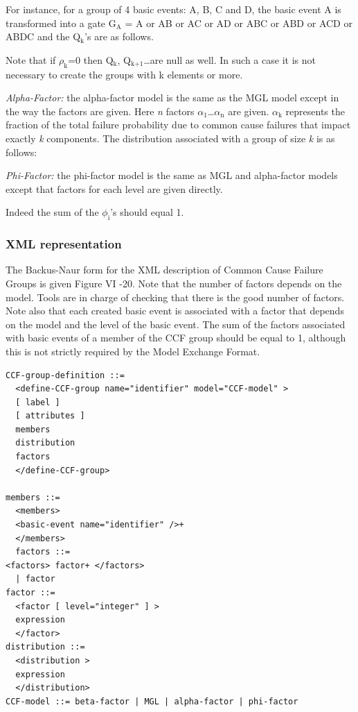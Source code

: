 \documentclass[11pt]{article}
\begin{document}
For instance, for a group of 4 basic events: A, B, C and D, the basic
event A is transformed into a gate G\(_{\text{A}}\) = A or AB or AC or AD or ABC or
ABD or ACD or ABDC and the Q\(_{\text{k}}\)'s are as follows.

Note that if \(\rho_{\text{k}}\)=0 then Q\(_{\text{k}}\), Q\(_{\text{k+1}}\)\ldots{}are null as well. In such a
case it is not necessary to create the groups with k elements or more.

\emph{Alpha-Factor:} the alpha-factor model is the same as the MGL model
except in the way the factors are given. Here \emph{n} factors \(\alpha_{\text{1}}\)\ldots{}\(\alpha_{\text{n}}\)
are given. \(\alpha_{\text{k}}\) represents the fraction of the total failure
probability due to common cause failures that impact exactly \emph{k}
components. The distribution associated with a group of size \emph{k} is as
follows:

\emph{Phi-Factor:} the phi-factor model is the same as MGL and alpha-factor
models except that factors for each level are given directly.

Indeed the sum of the \(\phi_{\text{i}}\)'s should equal 1.

\subsubsection{XML representation}
\label{sec:org5fd2bfc}

The Backus-Naur form for the XML description of Common Cause Failure
Groups is given Figure VI -20. Note that the number of factors depends
on the model. Tools are in charge of checking that there is the good
number of factors. Note also that each created basic event is associated
with a factor that depends on the model and the level of the basic
event. The sum of the factors associated with basic events of a member
of the CCF group should be equal to 1, although this is not strictly
required by the Model Exchange Format.

\begin{lstlisting}
CCF-group-definition ::=
  <define-CCF-group name="identifier" model="CCF-model" >
  [ label ]
  [ attributes ]
  members
  distribution
  factors
  </define-CCF-group>

members ::=
  <members>
  <basic-event name="identifier" />+
  </members>
  factors ::=
<factors> factor+ </factors>
  | factor
factor ::=
  <factor [ level="integer" ] >
  expression
  </factor>
distribution ::=
  <distribution >
  expression
  </distribution>
CCF-model ::= beta-factor | MGL | alpha-factor | phi-factor
\end{lstlisting}
\end{document}
